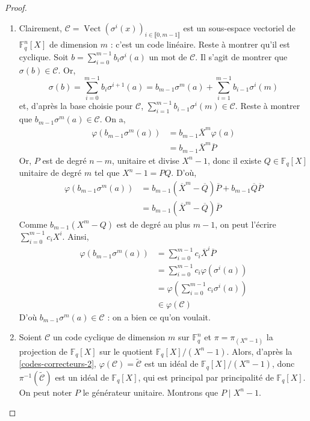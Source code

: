   \begin{proof}
    \begin{enumerate}[label=(\roman*)]
      \item Clairement, $\mathcal{C} = \operatorname{Vect}(\sigma^{i}(x))_{i \in \llbracket 0, m-1 \rrbracket}$ est un sous-espace vectoriel de $\mathbb{F}_q^n[X]$ de dimension $m$ : c'est un code linéaire. Reste à montrer qu'il est cyclique. Soit $b = \sum_{i=0}^{m-1} b_i \sigma^i(a)$ un mot de $\mathcal{C}$. Il s'agit de montrer que $\sigma(b) \in \mathcal{C}$. Or,
      \[ \sigma(b) = \sum_{i=0}^{m-1} b_i \sigma^{i+1}(a) = b_{m-1} \sigma^m(a) + \sum_{i=1}^{m-1} b_{i-1} \sigma^i(m) \]
      et, d'après la base choisie pour $\mathcal{C}$, $\sum_{i=1}^{m-1} b_{i-1} \sigma^i(m) \in \mathcal{C}$. Reste à montrer que $b_{m-1} \sigma^m(a) \in \mathcal{C}$. On a,
      \begin{align*}
        \varphi(b_{m-1} \sigma^m(a)) &= b_{m-1} \overline{X}^m \varphi(a) \\
        &= b_{m-1} \overline{X}^m \overline{P}
      \end{align*}
      Or, $P$ est de degré $n-m$, unitaire et divise $X^n - 1$, donc il existe $Q \in \mathbb{F}_q[X]$ unitaire de degré $m$ tel que $X^n - 1 = PQ$. D'où,
      \begin{align*}
        \varphi(b_{m-1} \sigma^m(a)) &= b_{m-1} (\overline{X}^m - \overline{Q})\overline{P} + b_{m-1}\overline{Q}\overline{P} \\
        &= b_{m-1} (\overline{X}^m - \overline{Q}) \overline{P}
      \end{align*}
      Comme $b_{m-1} (X^m - Q)$ est de degré au plus $m-1$, on peut l'écrire $\sum_{i=0}^{m-1} c_i X^i$. Ainsi,
      \begin{align*}
        \varphi(b_{m-1} \sigma^m(a)) &= \sum_{i=0}^{m-1} c_i \overline{X}^i \overline{P} \\
        &= \sum_{i=0}^{m-1} c_i \varphi(\sigma^i(a)) \\
        &= \varphi \left( \sum_{i=0}^{m-1} c_i \sigma^i(a) \right) \\
        &\in \varphi(\mathcal{C})
      \end{align*}
      D'où $b_{m-1} \sigma^m(a) \in \mathcal{C}$ : on a bien ce qu'on voulait.
      \item Soient $\mathcal{C}$ un code cyclique de dimension $m$ sur $\mathbb{F}_q^n$ et $\pi = \pi_{(X^n-1)}$ la projection de $\mathbb{F}_q[X]$ sur le quotient $\mathbb{F}_q[X]/(X^n-1)$. Alors, d'après la \cref{codes-correcteurs-2}, $\varphi(\mathcal{C}) = \widetilde{\mathcal{C}}$ est un idéal de $\mathbb{F}_q[X]/(X^n-1)$, donc $\pi^{-1}(\widetilde{\mathcal{C}})$ est un idéal de $\mathbb{F}_q[X]$, qui est principal par principalité de $\mathbb{F}_q[X]$. On peut noter $P$ le générateur unitaire. Montrons que $P \mid X^n - 1$.

\end{enumerate}
\end{proof}
